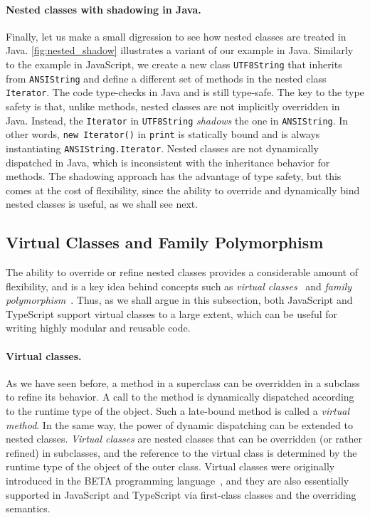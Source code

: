\paragraph{Nested classes with shadowing in Java.}
Finally, let us make a small digression to see how nested classes are treated in
Java. \autoref{fig:nested_shadow} illustrates a variant of our example in Java.
Similarly to the example in JavaScript, we create a new class
\lstinline{UTF8String} that inherits from \lstinline{ANSIString} and define a
different set of methods in the nested class \lstinline{Iterator}. The code
type-checks in Java and is still type-safe. The key to the type safety is that,
unlike methods, nested classes are not implicitly overridden in Java. Instead,
the \lstinline{Iterator} in \lstinline{UTF8String} \emph{shadows} the one in
\lstinline{ANSIString}. In other words, \lstinline{new Iterator()} in
\lstinline{print} is statically bound and is always instantiating
\lstinline{ANSIString.Iterator}. Nested classes are not dynamically dispatched
in Java, which is inconsistent with the inheritance behavior for methods. The
shadowing approach has the advantage of type safety, but this comes at the cost
of flexibility, since the ability to override and dynamically bind nested
classes is useful, as we shall see next.

\subsection{Virtual Classes and Family Polymorphism} \label{sec:family}

The ability to override or refine nested classes provides a considerable amount
of flexibility, and is a key idea behind concepts such as \emph{virtual
classes}~\citep{madsen1989virtual,ernst2006virtual,clarke2007tribe} and
\emph{family
polymorphism}~\citep{ernst2001family,saito2008lightweight,zhang2017familia}.
Thus, as we shall argue in this subsection, both JavaScript and TypeScript
support virtual classes to a large extent, which can be useful for writing
highly modular and reusable code.

\paragraph{Virtual classes.}
As we have seen before, a method in a superclass can be overridden in a subclass
to refine its behavior. A call to the method is dynamically dispatched according
to the runtime type of the object. Such a late-bound method is called a
\emph{virtual method}. In the same way, the power of dynamic dispatching can be
extended to nested classes. \emph{Virtual classes} are nested classes that can
be overridden (or rather refined) in subclasses, and the reference to the
virtual class is determined by the runtime type of the object of the outer
class. Virtual classes were originally introduced in the BETA programming
language~\citep{madsen1993object}, and they are also essentially supported in
JavaScript and TypeScript via first-class classes and the overriding semantics.


